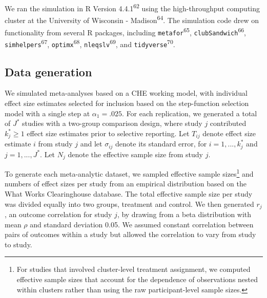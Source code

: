 \documentclass[
  american,
  man, donotrepeattitle,floatsintext]{apa7}
\begin{document}
We ran the simulation in R Version 4.4.1\textsuperscript{62} using the high-throughput computing cluster at the University of Wisconsin - Madison\textsuperscript{64}.
The simulation code drew on functionality from several R packages, including \texttt{metafor}\textsuperscript{65}, \texttt{clubSandwich}\textsuperscript{66}, \texttt{simhelpers}\textsuperscript{67}, \texttt{optimx}\textsuperscript{68}, \texttt{nleqslv}\textsuperscript{69}, and \texttt{tidyverse}\textsuperscript{70}.

\subsection{Data generation}\label{data-generation}

We simulated meta-analyses based on a CHE working model, with individual effect size estimates selected
for inclusion based on the step-function selection model with a single step at \(\alpha_1 = .025\).
For each replication, we generated a total of \(J^*\) studies with a two-group comparison
design, where study \(j\) contributed \(k_j^* \geq 1\) effect size estimates prior to selective reporting. Let
\(T_{ij}\) denote effect size estimate \(i\) from study \(j\) and let \(\sigma_{ij}\)
denote its standard error, for \(i = 1,...,k_j^*\) and \(j = 1,...,J^*\). Let \(N_j\)
denote the effective sample size from study \(j\).

To generate each meta-analytic dataset, we sampled effective sample sizes\footnote{For studies that involved cluster-level treatment assignment, we computed effective sample sizes that account for the dependence of observations nested within clusters rather than using the raw participant-level sample sizes.} and numbers of effect sizes per study from an empirical distribution based on the What Works Clearinghouse database.
The total effective sample size per study was divided equally into two groups, treatment and control.
We then generated \(r_j\), an outcome correlation for study \(j\), by drawing from a beta distribution with mean \(\rho\) and standard deviation 0.05.
We assumed constant correlation between pairs of outcomes within a study but allowed the correlation to vary from study to study.
\end{document}
